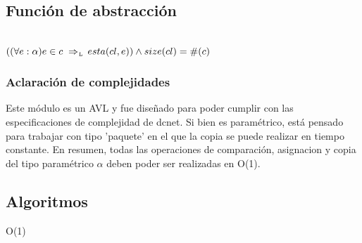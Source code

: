 \subsection{Función de abstracción}

 \\
$((\paratodo{\alpha}{e}) e \in c \impluego esta(cl,e)) \land size(cl) = \#(c)$

\subsubsection{Aclaración de complejidades}{
	Este módulo es un AVL y fue diseñado para poder cumplir con las especificaciones de complejidad de dcnet.
	Si bien es paramétrico, está pensado para trabajar con tipo 'paquete' en el que la 
	copia se puede realizar en tiempo constante.
	En resumen, todas las operaciones de comparación, asignacion y copia del tipo paramétrico $\alpha$
	deben poder ser realizadas en O(1).
}

\newpage
\subsection{Algoritmos}
{O(1)}

